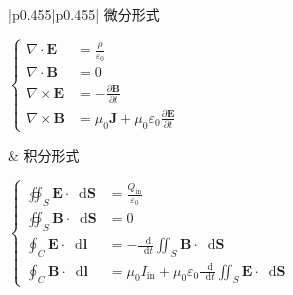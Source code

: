 \documentclass[UTF8,fontset=fandol,zihao=5]{ctexart}
\newcommand{\vect}[1]{\bm{#1}}
\newcommand{\dif}{\mathop{}\!\mathrm{d}}
\begin{document}
\small
\renewcommand{\arraystretch}{1.15}
\begin{longtable}{|p{}|p{}|}
\hline
\centering 微分形式

\(\displaystyle
\left\{
\begin{aligned}
\nabla\cdot\vect{E} &= \frac{\rho}{\varepsilon_0}\\
\nabla\cdot\vect{B} &= 0\\
\nabla\times\vect{E} &= -\frac{\partial\vect{B}}{\partial t}\\
\nabla\times\vect{B} &= \mu_0\vect{J}
+\mu_0\varepsilon_0\frac{\partial\vect{E}}{\partial t}
\end{aligned}
\right.
\)\par

& \centering\arraybackslash 积分形式

\(\displaystyle
\left\{
\begin{aligned}
\oiint_S \vect{E}\cdot\dif \vect{S}
&= \frac{Q_{\mathrm{in}}}{\varepsilon_0}\\
\oiint_S \vect{B}\cdot\dif \vect{S}
&= 0\\
\oint_C \vect{E}\cdot\dif \vect{l}
&= -\frac{\dif}{\dif t}
\iint_S \vect{B}\cdot\dif \vect{S}\\
\oint_C \vect{B}\cdot\dif \vect{l}
&= \mu_0 I_{\mathrm{in}}
+\mu_0\varepsilon_0\frac{\dif}{\dif t}
\iint_S \vect{E}\cdot\dif \vect{S}
\end{aligned}
\right.
\)\par

\\ \hline


\end{longtable}
\end{document}
